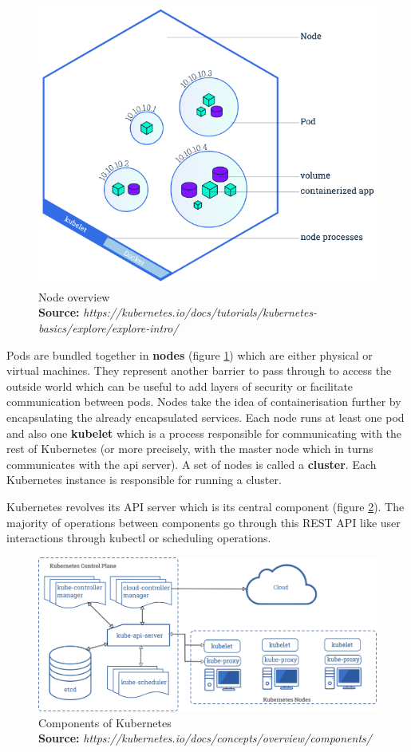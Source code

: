 \documentclass[12pt, a4paper]{memoir}
\newcommand*{\captionsource}[2]{%
    \caption[{#1}]{%
        #1%
        \\\hspace{\linewidth}%
	\textbf{Source:} \textit{#2}%
    }%
}
\begin{document}
\begin{figure}[h]
	\centering
	\includegraphics[scale=0.5]{./imgs/node-overview.png}
	\captionsource{Node overview}{https://kubernetes.io/docs/tutorials/kubernetes-basics/explore/explore-intro/}
	\label{fig:node-overview}
\end{figure}

Pods are bundled together in \textbf{nodes} (figure \ref{fig:node-overview})
which are either physical or virtual machines. They represent another barrier
to pass through to access the outside world which can be useful to add layers
of security or facilitate communication between pods. Nodes take the idea of
containerisation further by encapsulating the already encapsulated services.
Each node runs at least one pod and also one \textbf{kubelet} which is a
process responsible for communicating with the rest of Kubernetes (or more
precisely, with the master node which in turns communicates with the api
server). A set of nodes is called a \textbf{cluster}. Each Kubernetes instance
is responsible for running a cluster.

Kubernetes revolves its API server which is its central component (figure
\ref{fig:kube-components}). The majority of operations between components go
through this REST API like user interactions through kubectl or scheduling
operations.

\begin{figure}[h]
	\centering
	\includegraphics[width=\textwidth]{./imgs/components-of-kubernetes.png}
	\captionsource{Components of Kubernetes}{https://kubernetes.io/docs/concepts/overview/components/}
	\label{fig:kube-components}
\end{figure}
\end{document}
